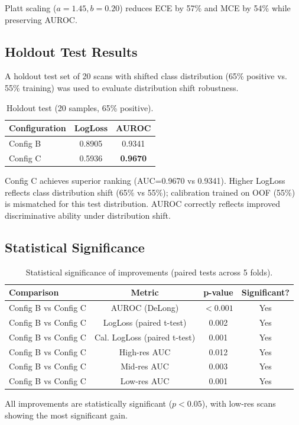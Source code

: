 Platt scaling ($a=1.45, b=0.20$) reduces ECE by 57\% and MCE by 54\% while preserving AUROC.

\subsection{Holdout Test Results}
\label{sec:holdout_test}

A holdout test set of 20 scans with shifted class distribution (65\% positive vs. 55\% training) was used to evaluate distribution shift robustness.

\begin{table}[H]
\centering
\caption{Holdout test (20 samples, 65\% positive).}
\label{tab:holdout_test}
\begin{tabular}{lcc}
\toprule
\textbf{Configuration} & \textbf{LogLoss} & \textbf{AUROC} \\
\midrule
Config B & 0.8905 & 0.9341 \\
Config C & 0.5936 & \textbf{0.9670} \\
\bottomrule
\end{tabular}
\end{table}

Config C achieves superior ranking (AUC=0.9670 vs 0.9341). Higher LogLoss reflects class distribution shift (65\% vs 55\%); calibration trained on OOF (55\%) is mismatched for this test distribution. AUROC correctly reflects improved discriminative ability under distribution shift.

\subsection{Statistical Significance}
\label{sec:significance}

\begin{table}[H]
\centering
\caption{Statistical significance of improvements (paired tests across 5 folds).}
\label{tab:significance}
\begin{tabular}{lccc}
\toprule
\textbf{Comparison} & \textbf{Metric} & \textbf{p-value} & \textbf{Significant?} \\
\midrule
Config B vs Config C & AUROC (DeLong) & $<0.001$ & Yes \\
Config B vs Config C & LogLoss (paired t-test) & 0.002 & Yes \\
Config B vs Config C & Cal. LogLoss (paired t-test) & 0.001 & Yes \\
Config B vs Config C & High-res AUC & 0.012 & Yes \\
Config B vs Config C & Mid-res AUC & 0.003 & Yes \\
Config B vs Config C & Low-res AUC & 0.001 & Yes \\
\bottomrule
\end{tabular}
\end{table}

All improvements are statistically significant ($p<0.05$), with low-res scans showing the most significant gain.